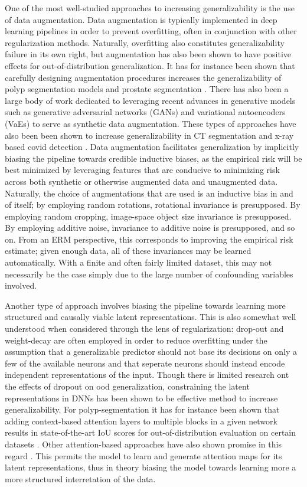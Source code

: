 One of the most well-studied approaches to increasing generalizability is the use of data augmentation. Data augmentation is typically implemented in deep learning pipelines in order to prevent overfitting, often in conjunction with other regularization methods. Naturally, overfitting also constitutes generalizability failure in its own right, but augmentation has also been shown to have positive effects for out-of-distribution generalization. It has for instance been shown that carefully designing augmentation procedures increases the generalizability of polyp segmentation models \cite{polyp_augmentation} and prostate segmentation \cite{augmentation_prostate}. There has also been a large body of work dedicated to leveraging recent advances in generative models such as generative adversarial networks (GANs) and variational autoencoders (VaEs) to serve as synthetic data augmentation. These types of approaches have also been been shown to increase generalizability in CT segmentation \cite{cyclegan} and x-ray based covid detection \cite{covid}. Data augmentation facilitates generalization by implicitly biasing the pipeline towards credible inductive biases, as the empirical risk will be best minimized by leveraging features that are conducive to minimizing risk across both synthetic or otherwise augmented data and unaugmented data. Naturally, the choice of augmentations that are used is an inductive bias in and of itself; by employing random rotations, rotational invariance is presupposed. By employing random cropping, image-space object size invariance is presupposed. By employing additive noise, invariance to additive noise is presupposed, and so on. From an ERM perspective, this corresponds to improving the empirical risk estimate; given enough data, all of these invariances may be learned automatically. With a finite and often fairly limited dataset, this may not necessarily be the case simply due to the large number of confounding variables involved. 

Another type of approach involves biasing the pipeline towards learning more structured and causally viable latent representations. This is also somewhat well understood when considered through the lens of regularization: drop-out and weight-decay are often employed in order to reduce overfitting under the assumption that a generalizable predictor should not base its decisions on only a few of the available neurons and that seperate neurons should instead encode independent representations of the input. Though there is limited research ont the effects of dropout on ood generalization, constraining the latent representations in DNNs has been shown to be effective method to increase generalizability. For polyp-segmentation it has for instance been shown that adding context-based attention layers to multiple blocks in a given network results in state-of-the-art IoU scores for out-of-distribution evaluation on certain datasets \cite{uacanet}. Other attention-based approaches have also shown promise in this regard \cite{attention_generalizability, reverse_attention}. This permits the model to learn and generate attention maps for its latent representations, thus in theory biasing the model towards learning more a more structured interretation of the data. 

